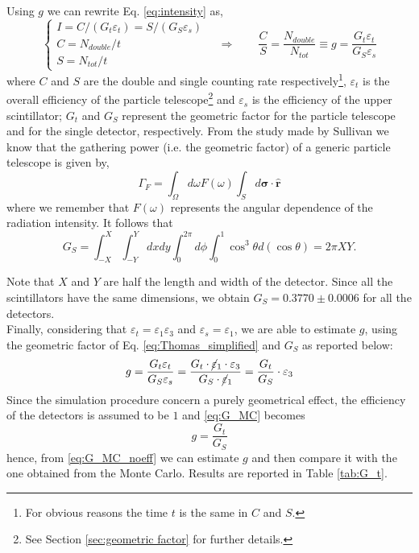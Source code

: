 Using $g$ we can rewrite Eq. \eqref{eq:intensity} as,
\begin{equation}\label{eq:g_Rozza}
	\begin{cases}
		I = C/\left(G_t \varepsilon_{t} \right)=S/\left(G_S \varepsilon_{s} \right)\\
		C = N_{double}/t \\
		S = N_{tot}/t
	\end{cases} \quad
	\Rightarrow\qquad \frac{C}{S} = \frac{N_{double}}{N_{tot}} \equiv g = \frac{G_t \varepsilon_{t}}{G_S \varepsilon_{s}}
\end{equation}
where $C$ and $S$ are the double and single counting rate respectively\footnote{For obvious reasons the time $t$ is the same in $C$ and $S$.}, $\varepsilon_{t}$ is the overall  efficiency of the particle telescope\footnote{See Section \ref{sec:geometric factor} for further details.} and $\varepsilon_{s}$ is the efficiency of the upper scintillator; $G_t$ and $G_S$ represent the geometric factor for the particle telescope and for the single detector, respectively. From the study made by Sullivan \cite{Sullivan} we know that the gathering power (i.e. the geometric factor) of a generic particle telescope is given by,
\begin{equation} \label{eq:gathering}
	\Gamma_F =\int_{\Omega}d\omega F(\omega)\int_{S}d\bm{\sigma}\cdot \mathbf{\hat{r}}
\end{equation}
where we remember that $F(\omega)$ represents the angular dependence of the radiation intensity. It follows that
\begin{equation}
	G_S = \int_{-X}^{X}\int_{-Y}^{Y}dxdy \int_{0}^{2\pi}d\phi \int_{0}^{1}\cos^3\theta d\left( \cos\theta\right) = 2\pi XY.
\end{equation}

Note that $X$ and $Y$ are half the length and width of the detector. Since all the scintillators have the same dimensions, we obtain $G_S = 0.3770\pm0.0006$ for all the detectors.\\
Finally, considering that $\varepsilon_{t} = \varepsilon_1 \varepsilon_3$ and $\varepsilon_{s} = \varepsilon_1$, we are able to estimate $g$, using the geometric factor of Eq. \eqref{eq:Thomas_simplified} and $G_S$ as reported below:
\begin{equation} \label{eq:G_MC}
	g = \frac{G_t\varepsilon_{t}}{G_S \varepsilon_{s}} = \frac{G_t \cdot \cancel \varepsilon_1\cdot \varepsilon_3}{G_S\cdot \cancel \varepsilon_1} = \frac{G_t}{G_S}\cdot \varepsilon_3
\end{equation}
Since the simulation procedure concern a purely geometrical effect, the efficiency of the detectors is assumed to be $1$ and \eqref{eq:G_MC} becomes
\begin{equation} \label{eq:G_MC_noeff}
	g = \frac{G_t}{G_S}
\end{equation}
hence, from \eqref{eq:G_MC_noeff} we can estimate $g$ and then compare it with the one obtained from the Monte Carlo. Results are reported in Table \ref{tab:G_t}.

